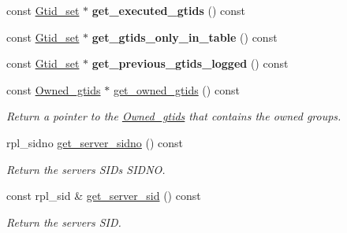\begin{DoxyCompactItemize}
\mbox{\label{classGtid__state_abe87f89a8f7034cc51af9ea19a8f3efb}} 
const \mbox{\hyperlink{classGtid__set}{Gtid\+\_\+set}} $\ast$ {\bfseries get\+\_\+executed\+\_\+gtids} () const
\item 
\mbox{\label{classGtid__state_ac09ed411b9de30e97c099ef09e60a7ee}} 
const \mbox{\hyperlink{classGtid__set}{Gtid\+\_\+set}} $\ast$ {\bfseries get\+\_\+gtids\+\_\+only\+\_\+in\+\_\+table} () const
\item 
\mbox{\label{classGtid__state_a08b781dbfe578099fc96958f14a39041}} 
const \mbox{\hyperlink{classGtid__set}{Gtid\+\_\+set}} $\ast$ {\bfseries get\+\_\+previous\+\_\+gtids\+\_\+logged} () const
\item 
\mbox{\label{classGtid__state_add0fc358faed4567b7b4f6c71d0f7b5d}} 
const \mbox{\hyperlink{classOwned__gtids}{Owned\+\_\+gtids}} $\ast$ \mbox{\hyperlink{classGtid__state_add0fc358faed4567b7b4f6c71d0f7b5d}{get\+\_\+owned\+\_\+gtids}} () const
\begin{DoxyCompactList}\small\item\em Return a pointer to the \mbox{\hyperlink{classOwned__gtids}{Owned\+\_\+gtids}} that contains the owned groups. \end{DoxyCompactList}\item 
\mbox{\label{classGtid__state_a56f262cfcb2e7cad774b61db9ecccde1}} 
rpl\+\_\+sidno \mbox{\hyperlink{classGtid__state_a56f262cfcb2e7cad774b61db9ecccde1}{get\+\_\+server\+\_\+sidno}} () const
\begin{DoxyCompactList}\small\item\em Return the server\textquotesingle{}s S\+ID\textquotesingle{}s S\+I\+D\+NO. \end{DoxyCompactList}\item 
\mbox{\label{classGtid__state_a0e47d659119962deb56ee07632ed6634}} 
const rpl\+\_\+sid \& \mbox{\hyperlink{classGtid__state_a0e47d659119962deb56ee07632ed6634}{get\+\_\+server\+\_\+sid}} () const
\begin{DoxyCompactList}\small\item\em Return the server\textquotesingle{}s S\+ID. \end{DoxyCompactList}\item 

\end{DoxyCompactItemize}
